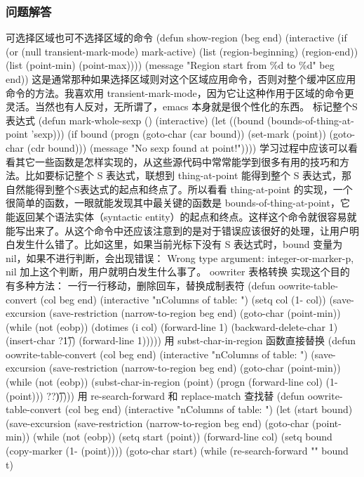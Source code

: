 \documentclass[11pt]{ctexart}
\begin{document}
{{{{\subsubsection{问题解答}
\label{sec:orgac977ed}
可选择区域也可不选择区域的命令
(defun show-region (beg end)
(interactive
(if (or (null transient-mark-mode)
mark-active)
(list (region-beginning) (region-end))
(list (point-min) (point-max))))
(message "Region start from \%d to \%d" beg end))
这是通常那种如果选择区域则对这个区域应用命令，否则对整个缓冲区应用命令的方法。我喜欢用 transient-mark-mode，因为它让这种作用于区域的命令更灵活。当然也有人反对，无所谓了，emacs 本身就是很个性化的东西。
标记整个S表达式
(defun mark-whole-sexp ()
(interactive)
(let ((bound (bounds-of-thing-at-point 'sexp)))
(if bound
(progn
(goto-char (car bound))
(set-mark (point))
(goto-char (cdr bound)))
(message "No sexp found at point!"))))
学习过程中应该可以看看其它一些函数是怎样实现的，从这些源代码中常常能学到很多有用的技巧和方法。比如要标记整个 S 表达式，联想到 thing-at-point 能得到整个 S 表达式，那自然能得到整个S表达式的起点和终点了。所以看看 thing-at-point 的实现，一个很简单的函数，一眼就能发现其中最关键的函数是 bounds-of-thing-at-point，它能返回某个语法实体（syntactic entity）的起点和终点。这样这个命令就很容易就能写出来了。从这个命令中还应该注意到的是对于错误应该很好的处理，让用户明白发生什么错了。比如这里，如果当前光标下没有 S 表达式时，bound 变量为 nil，如果不进行判断，会出现错误：
Wrong type argument: integer-or-marker-p, nil
加上这个判断，用户就明白发生什么事了。
oowriter 表格转换
实现这个目的有多种方法：
一行一行移动，删除回车，替换成制表符
(defun oowrite-table-convert (col beg end)
(interactive "nColumns of table: \nr")
(setq col (1- col))
(save-excursion
(save-restriction
(narrow-to-region beg end)
(goto-char (point-min))
(while (not (eobp))
(dotimes (i col)
(forward-line 1)
(backward-delete-char 1)
(insert-char ?\t 1))
(forward-line 1)))))
用 subst-char-in-region 函数直接替换
(defun oowrite-table-convert (col beg end)
(interactive "nColumns of table: \nr")
(save-excursion
(save-restriction
(narrow-to-region beg end)
(goto-char (point-min))
(while (not (eobp))
(subst-char-in-region
(point) (progn (forward-line col) (1- (point)))
?\n ?\t)))))
用 re-search-forward 和 replace-match 查找替
(defun oowrite-table-convert (col beg end)
(interactive "nColumns of table: \nr")
(let (start bound)
(save-excursion
(save-restriction
(narrow-to-region beg end)
(goto-char (point-min))
(while (not (eobp))
(setq start (point))
(forward-line col)
(setq bound (copy-marker (1- (point))))
(goto-char start)
(while (re-search-forward "\n" bound t)
}}}}
\end{document}
